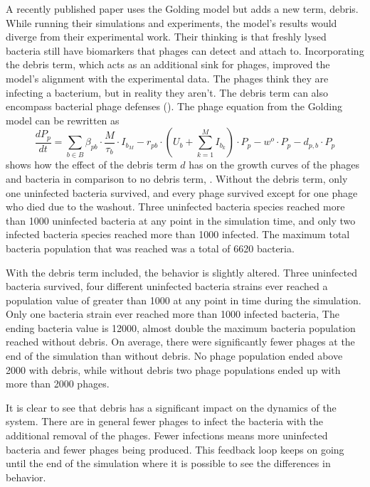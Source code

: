 A recently published paper \citet{deyEmergentHigherorderInteractions2025} uses the Golding model but adds a new term, debris. While running their simulations and experiments, the model's results would diverge from their experimental work. 
Their thinking is that freshly lysed bacteria still have biomarkers that phages can detect and attach to. 
Incorporating the debris term, which acts as an additional sink for phages, improved the model's alignment with the experimental data.
The phages think they are infecting a bacterium, but in reality they aren't. 
The debris term can also encompass bacterial phage defenses (). 
The phage equation from the Golding model can be rewritten as 
\[
    \frac{dP_p}{dt} = \sum_{b\in B}\beta_{p b}\cdot\frac{M}{\tau_b} \cdot I_{b_M} - r_{p b}\cdot(U_b + \sum_{k=1}^{M} I_{b_k})\cdot P_p - w^o \cdot P_p - d_{p, b} \cdot P_p
\]
 shows how the effect of the debris term $d$ has on the growth curves of the phages and bacteria in comparison to no debris term, . 
Without the debris term, only one uninfected bacteria survived, and every phage survived except for one phage who died due to the washout. 
Three uninfected bacteria species reached more than 1000 uninfected bacteria at any point in the simulation time, and only two infected bacteria species reached more than 1000 infected. 
The maximum total bacteria population that was reached was a total of 6620 bacteria. 

With the debris term included, the behavior is slightly altered. 
Three uninfected bacteria survived, four different uninfected bacteria strains ever reached a population value of greater than 1000 at any point in time during the simulation. 
Only one bacteria strain ever reached more than 1000 infected bacteria, 
The ending bacteria value is 12000, almost double the maximum bacteria population reached without debris. 
On average, there were significantly fewer phages at the end of the simulation than without debris. 
No phage population ended above 2000 with debris, while without debris two phage populations ended up with more than 2000 phages. 

It is clear to see that debris has a significant impact on the dynamics of the system. 
There are in general fewer phages to infect the bacteria with the additional removal of the phages. 
Fewer infections means more uninfected bacteria and fewer phages being produced. 
This feedback loop keeps on going until the end of the simulation where it is possible to see the differences in behavior. 





